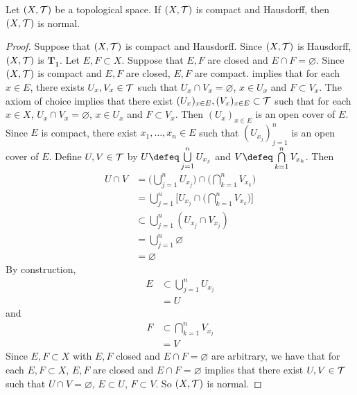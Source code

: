 \documentclass{book}
\begin{document}
	\begin{ex}
		Let $(X, \mathcal{T})$ be a topological space. If $(X, \mathcal{T})$ is compact and Hausdorff, then $(X, \mathcal{T})$ is normal.
	\end{ex}
	
	\begin{proof}
		Suppose that $(X, \mathcal{T})$ is compact and Hausdorff. Since $(X, \mathcal{T})$ is Hausdorff, $(X, \mathcal{T})$ is $\mathbf{T_1}$. Let $E, F \subset X$. Suppose that $E, F$ are closed and $E \cap F = \varnothing$. Since $(X, \mathcal{T})$ is compact and $E,F$ are closed, $E,F$ are compact.  implies that for each $x \in E$, there exists $U_x, V_x \in \mathcal{T}$ such that $U_x \cap V_x = \varnothing$, $x \in U_x$ and $F \subset V_x$. The axiom of choice implies that there exist $(U_x)_{x \in E}, (V_x)_{x \in E} \subset \mathcal{T}$ such that for each $x \in X$, $U_x \cap V_x = \varnothing$, $x \in U_x$ and $F \subset V_x$. Then $(U_x)_{x \in E}$ is an open cover of $E$. Since $E$ is compact, there exist $x_1, \ldots, x_n \in E$ such that $(U_{x_j})_{j=1}^n$ is an open cover of $E$. Define $U, V \in \mathcal{T}$ by $U \defeq \bigcup\limits_{j=1}^n U_{x_j}$ and $V \defeq \bigcap\limits_{k=1}^n V_{x_k}$. Then
		\begin{align*}
			U \cap V
			& = \bigg( \bigcup\limits_{j=1}^n U_{x_j} \bigg) \cap \bigg( \bigcap\limits_{k=1}^n V_{x_k} \bigg) \\
			& = \bigcup\limits_{j=1}^n \bigg[ U_{x_j} \cap \bigg( \bigcap\limits_{k=1}^n V_{x_k} \bigg) \bigg] \\
			& \subset \bigcup\limits_{j=1}^n ( U_{x_j} \cap V_{x_j} ) \\ 
			& = \bigcup\limits_{j=1}^n \varnothing \\
			& = \varnothing
		\end{align*}
		By construction,
		\begin{align*}
			E 
			& \subset \bigcup\limits_{j=1}^n U_{x_j} \\
			& = U
		\end{align*}
		and 
		\begin{align*}
			F 
			& \subset \bigcap\limits_{k=1}^n V_{x_j} \\
			& = V
		\end{align*}
		Since $E, F \subset X$ with $E,F$ closed and $E \cap F = \varnothing$ are arbitrary, we have that for each $E, F \subset X$, $E,F$ are closed and $E \cap F = \varnothing$ implies that there exist $U,V \in \mathcal{T}$ such that $U \cap V = \varnothing$, $E \subset U$, $F \subset V$. So $(X, \mathcal{T})$ is normal.
	\end{proof}
		
\end{document}
